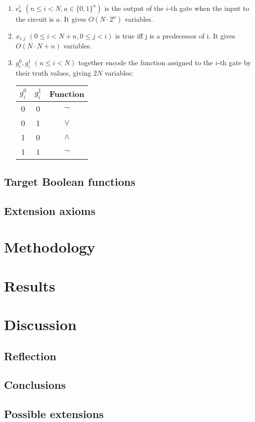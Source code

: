 \documentclass{article}
\begin{document}
\begin{enumerate}
  \item \(e^i_a\) \((n \leq i < N, a\in\{0,1\}^n)\) is the output of the \(i\)-th gate when the input to the circuit is \(a\). It gives \(O(N\cdot 2^n)\) variables.
  \item \(x_{i,j}\) \(( 0 \leq i < N+n,0 \leq j < i)\) is true iff j is a predecessor of i. It gives \(O(N\cdot N+n)\) variables.
  \item \(g^0_i, g^1_i\) \((n \leq i < N)\) together encode the function assigned to the \(i\)-th gate by their truth values, giving \(2N\) variables:

    \begin{center}
    \begin{tabular}{ |c|c|c| }
    \hline
    \(g^0_i\) & \(g^1_i\) & Function \\ 
    \hline
    0 & 0 & \(\neg\) \\  
    0 & 1 & \(\lor\) \\ 
    1 & 0 & \(\land\) \\ 
    1 & 1 & \(\neg\) \\   
    \hline
    \end{tabular}
    \end{center}

\end{enumerate}

\subsection{Target Boolean functions}

\subsection{Extension axioms}

\section{Methodology}

\section{Results}

\section{Discussion}

\subsection{Reflection}

\subsection{Conclusions}

\subsection{Possible extensions}

 

\end{document}
